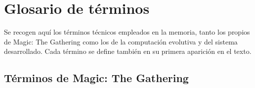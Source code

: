 
\chapter*{Glosario de términos}

Se recogen aquí los términos técnicos empleados en la memoria, tanto los propios de Magic: The Gathering como los de la computación evolutiva y del sistema desarrollado. Cada término se define también en su primera aparición en el texto.

\section*{Términos de Magic: The Gathering}


